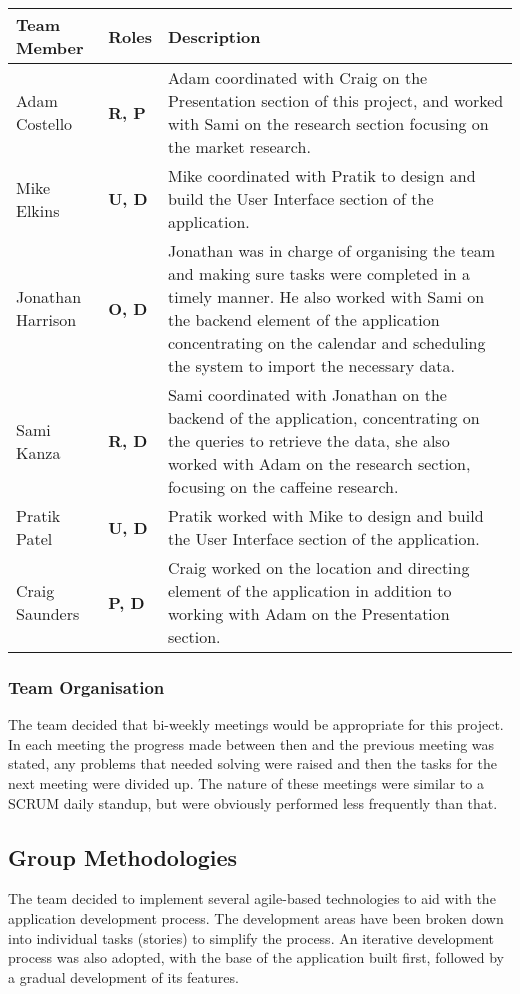 \begin{tabular}{|p{90pt}|p{30pt}|p{300pt}|}
\hline
\textbf{Team Member} 	& \textbf{Roles} 	& \textbf{Description} 
\\\hline
Adam Costello 		& \textbf{R, P} 	& Adam coordinated with Craig on the Presentation section of this project, and worked with Sami on the research section focusing on the market research. 
\\\hline 
Mike Elkins 		& \textbf{U, D} 	& Mike coordinated with Pratik to design and build the User Interface section of the application.
\\\hline
Jonathan Harrison 	& \textbf{O, D} 	& Jonathan was in charge of organising the team and making sure tasks were completed in a timely manner. He also worked with Sami on the backend element of the							  application concentrating on the calendar and scheduling the system to import the necessary data.
\\\hline
Sami Kanza 		& \textbf{R, D} 	& Sami coordinated with Jonathan on the backend of the application, concentrating on the queries to retrieve the data, she also worked with Adam on the research						  section, focusing on the caffeine research.
\\\hline 
Pratik Patel 		& \textbf{U, D} 	& Pratik worked with Mike to design and build the User Interface section of the application. 
\\\hline
Craig Saunders 		& \textbf{P, D} 	& Craig worked on the location and directing element of the application in addition to working with Adam on the Presentation section. 
\\\hline
\end{tabular}

\subsubsection{Team Organisation}
The team decided that bi-weekly meetings would be appropriate for this project. In each meeting the progress made between then and the previous meeting was stated, any problems that needed solving were raised and then the tasks for the next meeting were divided up. The nature of these meetings were similar to a SCRUM \cite{scrum} daily standup, but were obviously performed less frequently than that.  

\subsection{Group Methodologies}
The team decided to implement several agile-based technologies to aid with the application development process. The development areas have been broken down into individual tasks (stories) to simplify the process. An iterative development process was also adopted, with the base of the application built first, followed by a gradual development of its features. 

